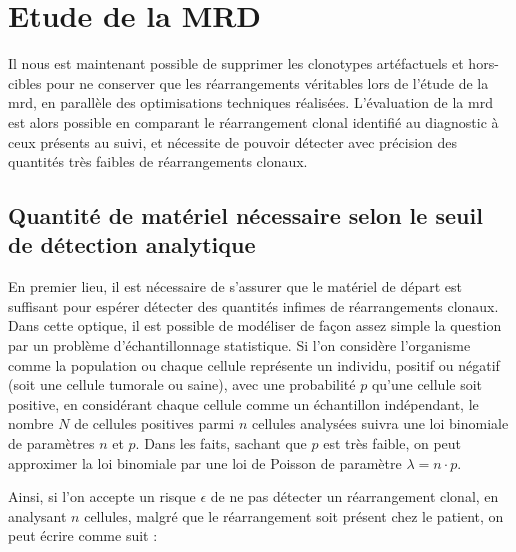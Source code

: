 \section{Etude de la MRD}

Il nous est maintenant possible de supprimer les clonotypes artéfactuels et
hors-cibles pour ne conserver que les réarrangements véritables lors de l'étude
de la \gls{mrd}, en parallèle des optimisations techniques réalisées.
L'évaluation de la \gls{mrd} est alors possible en comparant le réarrangement
clonal identifié au diagnostic à ceux présents au suivi, et nécessite de
pouvoir détecter avec précision des quantités très faibles de réarrangements
clonaux.

\subsection{Quantité de matériel nécessaire selon le seuil de détection analytique}


En premier lieu, il est nécessaire de s'assurer que le matériel de départ est
suffisant pour espérer détecter des quantités infimes de réarrangements
clonaux. Dans cette optique, il est possible de modéliser de façon assez simple
la question par un problème d'échantillonnage statistique. Si l'on considère
l'organisme comme la population ou chaque cellule représente un individu,
positif ou négatif (soit une cellule tumorale ou saine), avec une probabilité
$p$ qu'une cellule soit positive, en considérant chaque cellule comme un
échantillon indépendant, le nombre $N$ de cellules positives parmi $n$ cellules
analysées suivra une loi binomiale de paramètres $n$ et $p$. Dans les faits,
sachant que $p$ est très faible, on peut approximer la loi binomiale par une
loi de Poisson de paramètre $\lambda = n \cdot p$.

\vspace{1em}

Ainsi, si l'on accepte un risque $\epsilon$ de ne pas détecter un réarrangement
clonal, en analysant $n$ cellules, malgré que le réarrangement soit présent
chez le patient, on peut écrire comme suit :

